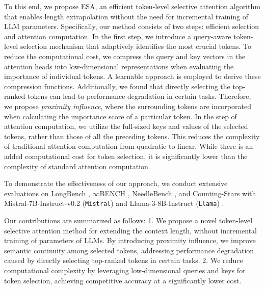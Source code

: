 To this end, we propose ESA, an efficient token-level selective attention algorithm that enables length extrapolation without the need for incremental training of LLM parameters. Specifically, our method consists of two steps: efficient selection and attention computation. 
In the first step, we introduce a query-aware token-level selection mechanism that adaptively identifies the most crucial tokens.
To reduce the computational cost, we compress the query and key vectors in the attention heads into low-dimensional representations when evaluating the importance of individual tokens. A learnable approach is employed to derive these compression functions.
Additionally, we found that directly selecting the top-ranked tokens can lead to performance degradation in certain tasks. Therefore, we propose \emph{proximity influence}, where the surrounding tokens are incorporated when calculating the importance score of a particular token.
In the step of attention computation, we utilize the full-sized keys and values of the selected tokens, rather than those of all the preceding tokens. This reduces the complexity of traditional attention computation from quadratic to linear. While there is an added computational cost for token selection, it is significantly lower than the complexity of standard attention computation.

To demonstrate the effectiveness of our approach, we conduct extensive evaluations on LongBench \citep{bai2023longbench},
$\infty$BENCH \citep{zhang2024bench}, NeedleBench \citep{li2024needlebench}, and Counting-Stars \citep{song2024counting} with Mistral-7B-Instruct-v0.2 (\texttt{Mistral}) \citep{jiang2023mistral} and Llama-3-8B-Instruct (\texttt{Llama}) \citep{llama3modelcard}.

Our contributions are summarized as follows: 1. We propose a novel token-level selective attention method for extending the context length, without incremental training of parameters of LLMs. By introducing proximity influence, we improve semantic continuity among selected tokens, addressing performance degradation caused by directly selecting top-ranked tokens in certain tasks. 2. We reduce computational complexity by leveraging low-dimensional queries and keys for token selection, achieving competitive accuracy at a significantly lower cost.


